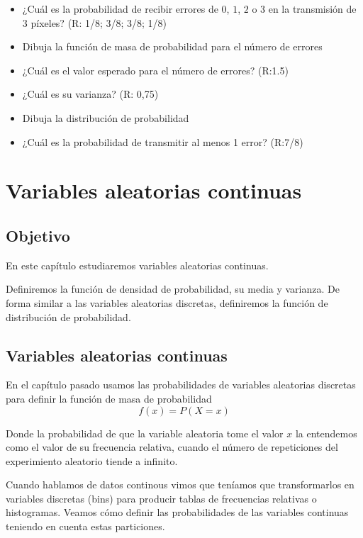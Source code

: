 \documentclass[
]{book}
\begin{document}
\begin{itemize}
\item
  ¿Cuál es la probabilidad de recibir errores de \(0\), \(1\), \(2\) o \(3\) en la transmisión de \(3\) píxeles? (R: 1/8; 3/8; 3/8; 1/8)
\item
  Dibuja la función de masa de probabilidad para el número de errores
\item
  ¿Cuál es el valor esperado para el número de errores? (R:1.5)
\item
  ¿Cuál es su varianza? (R: 0,75)
\item
  Dibuja la distribución de probabilidad
\item
  ¿Cuál es la probabilidad de transmitir al menos 1 error? (R:7/8)
\end{itemize}

\hypertarget{variables-aleatorias-continuas}{%
\chapter{Variables aleatorias continuas}\label{variables-aleatorias-continuas}}

\hypertarget{objetivo-2}{%
\section{Objetivo}\label{objetivo-2}}

En este capítulo estudiaremos variables aleatorias continuas.

Definiremos la función de densidad de probabilidad, su media y varianza. De forma similar a las variables aleatorias discretas, definiremos la función de distribución de probabilidad.

\hypertarget{variables-aleatorias-continuas-1}{%
\section{Variables aleatorias continuas}\label{variables-aleatorias-continuas-1}}

En el capítulo pasado usamos las probabilidades de variables aleatorias discretas para definir la función de masa de probabilidad \[f(x)=P(X= x)\]

Donde la probabilidad de que la variable aleatoria tome el valor \(x\) la entendemos como el valor de su frecuencia relativa, cuando el número de repeticiones del experimiento aleatorio tiende a infinito.

Cuando hablamos de datos continous vimos que teníamos que transformarlos en variables discretas (bins) para producir tablas de frecuencias relativas o histogramas. Veamos cómo definir las probabilidades de las variables continuas teniendo en cuenta estas particiones.
\end{document}
